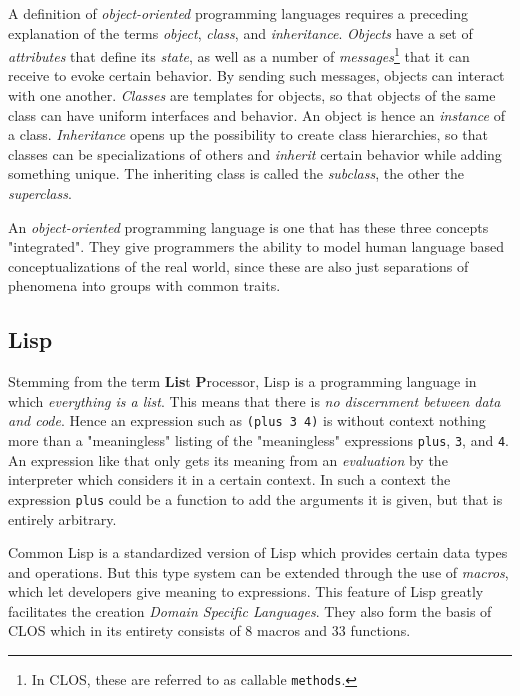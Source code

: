 \documentclass[oribibl]{llncs}
\begin{document}
A definition of \emph{object-oriented} programming languages requires a preceding explanation of the terms \emph{object}, \emph{class}, and \emph{inheritance}. \emph{Objects} have a set of \emph{attributes} that define its \emph{state}, as well as a number of \emph{messages}\footnote{In CLOS, these are referred to as callable \texttt{methods}.} that it can receive to evoke certain behavior. By sending such messages, objects can interact with one another. \emph{Classes} are templates for objects, so that objects of the same class can have uniform interfaces and behavior. An object is hence an \emph{instance} of a class. \emph{Inheritance} opens up the possibility to create class hierarchies, so that classes can be specializations of others and \emph{inherit} certain behavior while adding something unique. The inheriting class is called the \emph{subclass}, the other the \emph{superclass}.

An \emph{object-oriented} programming language is one that has these three concepts "integrated". They give programmers the ability to model human language based conceptualizations of the real world, since these are also just separations of phenomena into groups with common traits.

\subsection{Lisp}
\label{sec:lisp}

Stemming from the term \textbf{Lis}t \textbf{P}rocessor, Lisp is a programming language in which \emph{everything is a list}. This means that there is \emph{no discernment between data and code}. Hence an expression such as \texttt{(plus 3 4)} is without context nothing more than a "meaningless" listing of the "meaningless" expressions \texttt{plus}, \texttt{3}, and \texttt{4}. An expression like that only gets its meaning from an \emph{evaluation} by the interpreter which considers it in a certain context. In such a context the expression \texttt{plus} could be a function to add the arguments it is given, but that is entirely arbitrary. 

Common Lisp is a standardized version of Lisp which provides certain data types and operations. But this type system can be extended through the use of \emph{macros}, which let developers give meaning to expressions. This feature of Lisp greatly facilitates the creation \emph{Domain Specific Languages}. \cite{fowler2011domain-specific} They also form the basis of CLOS which in its entirety consists of 8 macros and 33 functions.
\end{document}
